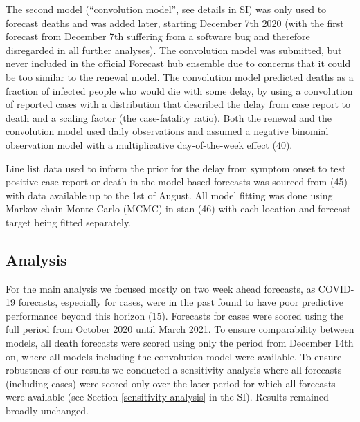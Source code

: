 \documentclass[
]{article}
\begin{document}
The second model (``convolution model'', see details in SI) was only used to forecast deaths and was added later, starting December 7th 2020 (with the first forecast from December 7th suffering from a software bug and therefore disregarded in all further analyses). The convolution model was submitted, but never included in the official Forecast hub ensemble due to concerns that it could be too similar to the renewal model. The convolution model predicted deaths as a fraction of infected people who would die with some delay, by using a convolution of reported cases with a distribution that described the delay from case report to death and a scaling factor (the case-fatality ratio). Both the renewal and the convolution model used daily observations and assumed a negative binomial observation model with a multiplicative day-of-the-week effect (40).

Line list data used to inform the prior for the delay from symptom onset to test positive case report or death in the model-based forecasts was sourced from (45) with data available up to the 1st of August. All model fitting was done using Markov-chain Monte Carlo (MCMC) in stan (46) with each location and forecast target being fitted separately.

\hypertarget{analysis}{%
\subsection{Analysis}\label{analysis}}

For the main analysis we focused mostly on two week ahead forecasts, as COVID-19 forecasts, especially for cases, were in the past found to have poor predictive performance beyond this horizon (15). Forecasts for cases were scored using the full period from October 2020 until March 2021. To ensure comparability between models, all death forecasts were scored using only the period from December 14th on, where all models including the convolution model were available. To ensure robustness of our results we conducted a sensitivity analysis where all forecasts (including cases) were scored only over the later period for which all forecasts were available (see Section \ref{sensitivity-analysis} in the SI). Results remained broadly unchanged.
\end{document}
